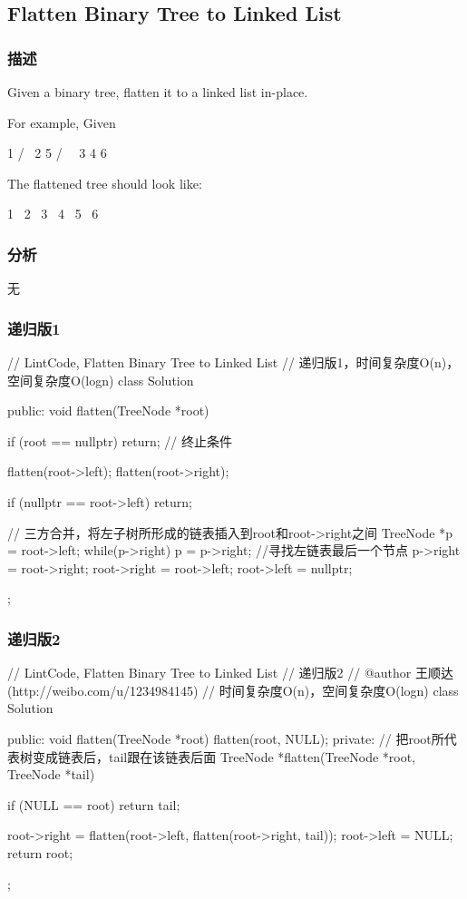 \subsection{Flatten Binary Tree to Linked List}
\label{sec:flatten-binary-tree-to-linked-list}


\subsubsection{描述}
Given a binary tree, flatten it to a linked list in-place.

For example, Given
\begin{Code}
         1
        / \
       2   5
      / \   \
     3   4   6
\end{Code}

The flattened tree should look like:
\begin{Code}
   1
    \
     2
      \
       3
        \
         4
          \
           5
            \
             6
\end{Code}

\subsubsection{分析}
无


\subsubsection{递归版1}
\begin{Code}
// LintCode, Flatten Binary Tree to Linked List
// 递归版1，时间复杂度O(n)，空间复杂度O(logn)
class Solution {
public:
    void flatten(TreeNode *root) {
        if (root == nullptr) return;  // 终止条件

        flatten(root->left);
        flatten(root->right);

        if (nullptr == root->left) return;

        // 三方合并，将左子树所形成的链表插入到root和root->right之间
        TreeNode *p = root->left;
        while(p->right) p = p->right; //寻找左链表最后一个节点
        p->right = root->right;
        root->right = root->left;
        root->left = nullptr;
    }
};
\end{Code}


\subsubsection{递归版2}
\begin{Code}
// LintCode, Flatten Binary Tree to Linked List
// 递归版2
// @author 王顺达(http://weibo.com/u/1234984145)
// 时间复杂度O(n)，空间复杂度O(logn)
class Solution {
public:
    void flatten(TreeNode *root) {
        flatten(root, NULL);
    }
private:
    // 把root所代表树变成链表后，tail跟在该链表后面
    TreeNode *flatten(TreeNode *root, TreeNode *tail) {
        if (NULL == root) return tail;

        root->right = flatten(root->left, flatten(root->right, tail));
        root->left = NULL;
        return root;
    }
};
\end{Code}


